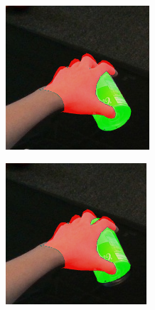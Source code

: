 \begin{figure}[h!]
\begin{subfigure}[b]{0.16\linewidth}
  \end{subfigure}
  \begin{subfigure}[b]{0.16\linewidth}
    \includegraphics[width=0.98\linewidth]{figs/9063_0}
  \end{subfigure}
  \begin{subfigure}[b]{0.16\linewidth}
    \includegraphics[width=0.98\linewidth]{figs/9063_9}

\end{subfigure}
\end{figure}
